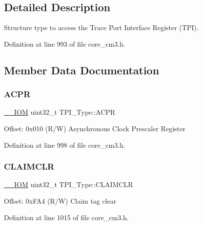 \subsection{Detailed Description}
Structure type to access the Trace Port Interface Register (T\+PI). 

Definition at line 993 of file core\+\_\+cm3.\+h.



\subsection{Member Data Documentation}
\mbox{\label{struct_t_p_i___type_a9e5e4421ef9c3d5b7ff8b24abd4e99b3}} 
\subsubsection{\texorpdfstring{A\+C\+PR}{ACPR}}
{\footnotesize\ttfamily \hyperlink{core__sc300_8h_ab6caba5853a60a17e8e04499b52bf691}{\+\_\+\+\_\+\+I\+OM} uint32\+\_\+t T\+P\+I\+\_\+\+Type\+::\+A\+C\+PR}

Offset\+: 0x010 (R/W) Asynchronous Clock Prescaler Register 

Definition at line 998 of file core\+\_\+cm3.\+h.

\mbox{\label{struct_t_p_i___type_a0e10e292cb019a832b03ddd055b2f6ac}} 
\subsubsection{\texorpdfstring{C\+L\+A\+I\+M\+C\+LR}{CLAIMCLR}}
{\footnotesize\ttfamily \hyperlink{core__sc300_8h_ab6caba5853a60a17e8e04499b52bf691}{\+\_\+\+\_\+\+I\+OM} uint32\+\_\+t T\+P\+I\+\_\+\+Type\+::\+C\+L\+A\+I\+M\+C\+LR}

Offset\+: 0x\+F\+A4 (R/W) Claim tag clear 

Definition at line 1015 of file core\+\_\+cm3.\+h.

\mbox{\label{struct_t_p_i___type_af8b7d15fa5252b733dd4b11fa1b5730a}} 
